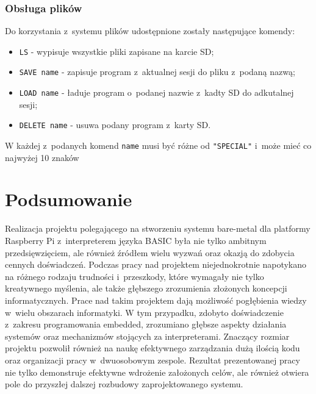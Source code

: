 \documentclass[shortabstract]{iithesis}
\begin{document}
\subsection{Obsługa plików}
Do korzystania z~systemu plików udostępnione zostały następujące komendy:
\begin{itemize}
 \item \texttt{LS} - wypisuje wszystkie pliki zapisane na karcie SD;
 \item \texttt{SAVE name} - zapisuje program z~aktualnej sesji do pliku z~podaną nazwą;
 \item \texttt{LOAD name} - ładuje program o~podanej nazwie z~kadty SD do adkutalnej sesji;
 \item \texttt{DELETE name} - usuwa podany program z~karty SD.
\end{itemize}
W każdej z~podanych komend \texttt{name} musi być różne od \texttt{"SPECIAL"} i~może mieć co najwyżej 10 znaków

\chapter*{Podsumowanie}
Realizacja projektu polegającego na stworzeniu systemu bare-metal dla platformy Raspberry Pi z~interpreterem języka BASIC była nie tylko ambitnym przedsięwzięciem, ale również źródłem wielu wyzwań oraz okazją do zdobycia cennych doświadczeń. Podczas pracy nad projektem niejednokrotnie napotykano na różnego rodzaju trudności i~przeszkody, które wymagały nie tylko kreatywnego myślenia, ale także głębszego zrozumienia złożonych koncepcji informatycznych.
Prace nad takim projektem dają możliwość pogłębienia wiedzy w~wielu obszarach informatyki. W tym przypadku, zdobyto doświadczenie z~zakresu programowania embedded, zrozumiano głębsze aspekty działania systemów oraz mechanizmów stojących za interpreterami. Znaczący rozmiar projektu pozwolił również na naukę efektywnego zarządzania dużą ilością kodu oraz organizacji pracy w~dwuosobowym zespole.
Rezultat prezentowanej pracy nie tylko demonstruje efektywne wdrożenie założonych celów, ale również otwiera pole do przyszłej dalszej rozbudowy zaprojektowanego systemu. 
\end{document}
